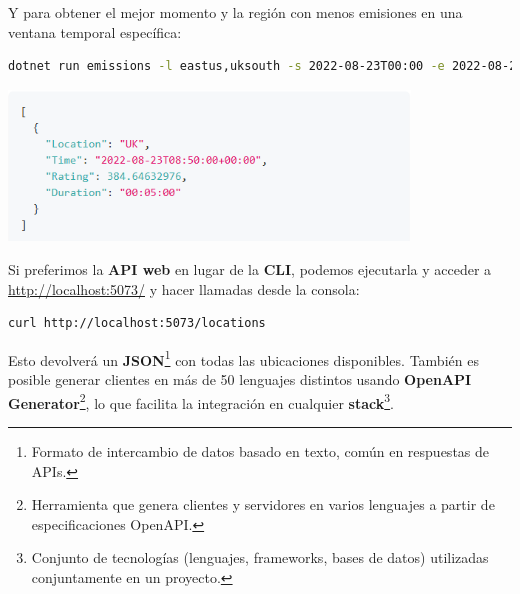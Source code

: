 \documentclass[12pt,a4paper]{report}
\begin{document}
Y para obtener el mejor momento y la región con menos emisiones en una ventana
temporal específica:

\begin{tcolorbox}[colback=codebackground, colframe=codeborder, boxrule=0.8pt, arc=0mm, boxsep=5pt, left=5pt, right=5pt, top=5pt, bottom=5pt]
  \begin{lstlisting}[language=bash]
dotnet run emissions -l eastus,uksouth -s 2022-08-23T00:00 -e 2022-08-23T23:59 --best
\end{lstlisting}
\end{tcolorbox}

\begin{center}
  \includegraphics[width=0.8\textwidth]{imagenes/CASDK_2.png}
\end{center}

Si preferimos la \textbf{API web} en
lugar de la \textbf{CLI}, podemos ejecutarla y
acceder a \href{http://localhost:5073}{http://localhost:5073/} y hacer llamadas
desde la consola:

\begin{tcolorbox}[colback=codebackground, colframe=codeborder, boxrule=0.8pt, arc=0mm, boxsep=5pt, left=5pt, right=5pt, top=5pt, bottom=5pt]
  \begin{lstlisting}[language=bash]
curl http://localhost:5073/locations
\end{lstlisting}
\end{tcolorbox}

Esto devolverá un \textbf{JSON}\footnote{Formato de intercambio de datos basado
  en texto, común en respuestas de APIs.} con todas las ubicaciones disponibles.
También es posible generar clientes en más de 50 lenguajes distintos usando
\textbf{OpenAPI Generator}\footnote{Herramienta que genera clientes y
  servidores en varios lenguajes a partir de especificaciones OpenAPI.}, lo que
facilita la integración en cualquier \textbf{stack}\footnote{Conjunto de
  tecnologías (lenguajes, frameworks, bases de datos) utilizadas conjuntamente en
  un proyecto.}.
\end{document}
